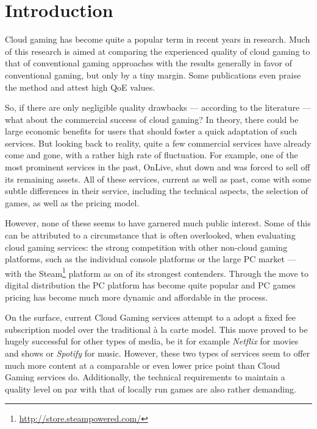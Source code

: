 

\section{Introduction}

Cloud gaming has become quite a popular term in recent years in research. Much of this research is aimed at comparing the experienced quality of cloud gaming to that of conventional gaming approaches with the results generally in favor of conventional gaming, but only by a tiny margin. Some publications even praise the method and attest high \gls{QoE} values.

So, if there are only negligible quality drawbacks --- according to the literature --- what about the commercial success of cloud gaming? In theory, there could be large economic benefits for users that should foster a quick adaptation of such services. But looking back to reality, quite a few commercial services have already come and gone, with a rather high rate of fluctuation. For example, one of the most prominent services in the past, OnLive, shut down and was forced to sell off its remaining assets. All of these services, current as well as past, come with some subtle differences in their service, including the technical aspects, the selection of games, as well as the pricing model.

However, none of these seems to have garnered much public interest. Some of this can be attributed to a circumstance that is often overlooked, when evaluating cloud gaming services: the strong competition with other non-cloud gaming platforms, such as the individual console platforms or the large PC market --- with the Steam\footnote{\url{http://store.steampowered.com/}} platform as on of its strongest contenders. Through the move to digital distribution the PC platform has become quite popular and PC games pricing has become much more dynamic and affordable in the process.

On the surface, current Cloud Gaming services attempt to a adopt a fixed fee subscription model over the traditional à la carte model. This move proved to be hugely successful for other types of media, be it for example \textit{Netflix} for movies and shows or \textit{Spotify} for music. However, these two types of services seem to offer much more content at a comparable or even lower price point than Cloud Gaming services do. Additionally, the technical requirements to maintain a quality level on par with that of locally run games are also rather demanding.

